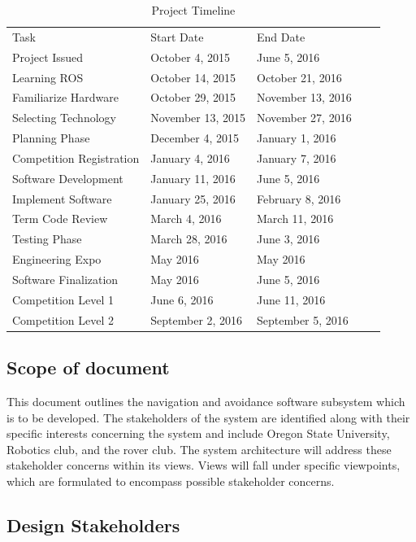 \documentclass[10pt, oneside,onecolumn]{IEEEtran}
\begin{document}
\begin{table}[H]
\centering
\caption{Project Timeline}
\begin{tabular}{lllll}
Task               & Start Date     & End Date                         &  &  \\
Project Issued & October 4, 2015  & June 5, 2016 &  &  \\
Learning ROS & October 14, 2015 & October 21, 2016 &  &  \\
Familiarize Hardware & October 29, 2015 & November 13, 2016 &  &  \\
Selecting Technology & November 13, 2015 & November 27, 2016 &  &  \\
Planning Phase & December 4, 2015 & January 1, 2016 &  &  \\
Competition Registration & January 4, 2016 & January 7, 2016 &  &  \\
Software Development & January 11, 2016 & June 5, 2016 &  &  \\
Implement Software & January 25, 2016 & February 8, 2016 &  &  \\
Term Code Review & March 4, 2016 & March 11, 2016 &  &  \\
Testing Phase & March 28, 2016 & June 3, 2016 &  &  \\
Engineering Expo & May 2016 & May 2016 &  &  \\
Software Finalization  & May 2016 & June 5, 2016 &  &  \\
Competition Level 1 & June 6, 2016 & June 11, 2016 &  & \\
Competition Level 2 & September 2, 2016 & September 5, 2016 &  &  \\
\end{tabular}
\end{table}

\subsection{Scope of document}

This document outlines the navigation and avoidance software subsystem which is to be developed. The stakeholders of the system are identified along with their specific interests concerning the system and include Oregon State University, Robotics club, and the rover club. The system architecture will address these stakeholder concerns within its views. Views will fall under specific viewpoints, which are formulated to encompass possible stakeholder concerns. 

\subsection{Design Stakeholders}
\end{document}
